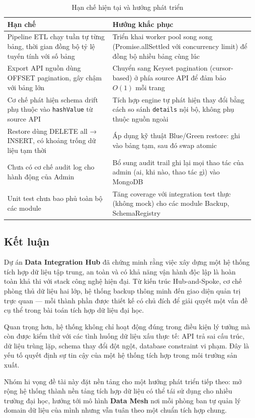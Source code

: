 \begin{table}[H]
\centering
\caption{Hạn chế hiện tại và hướng phát triển}
\label{tab:limitations}
\begin{tabular}{p{5.5cm}p{7.5cm}}
\toprule
\textbf{Hạn chế} & \textbf{Hướng khắc phục} \\
\midrule
Pipeline ETL chạy tuần tự từng bảng, thời gian đồng bộ tỷ lệ tuyến tính với số bảng &
Triển khai worker pool song song (Promise.allSettled với concurrency limit) để đồng bộ nhiều bảng cùng lúc \\[6pt]

Export API nguồn dùng OFFSET pagination, gây chậm với bảng lớn &
Chuyển sang Keyset pagination (cursor-based) ở phía source API để đảm bảo \(O(1)\) mỗi trang \\[6pt]

Cơ chế phát hiện schema drift phụ thuộc vào \texttt{hashValue} từ source API &
Tích hợp engine tự phát hiện thay đổi bằng cách so sánh \texttt{details} nội bộ, không phụ thuộc nguồn ngoài \\[6pt]

Restore dùng DELETE all → INSERT, có khoảng trống dữ liệu tạm thời &
Áp dụng kỹ thuật Blue/Green restore: ghi vào bảng tạm, sau đó swap atomic \\[6pt]

Chưa có cơ chế audit log cho hành động của Admin &
Bổ sung audit trail ghi lại mọi thao tác của admin (ai, khi nào, thao tác gì) vào MongoDB \\[6pt]

Unit test chưa bao phủ toàn bộ các module &
Tăng coverage với integration test thực (không mock) cho các module Backup, SchemaRegistry \\
\bottomrule
\end{tabular}
\end{table}

\subsection{Kết luận}

Dự án \textbf{Data Integration Hub} đã chứng minh rằng việc xây dựng một hệ thống tích hợp dữ liệu tập trung, an toàn và có khả năng vận hành độc lập là hoàn toàn khả thi với stack công nghệ hiện đại. Từ kiến trúc Hub-and-Spoke, cơ chế phòng thủ dữ liệu hai lớp, hệ thống backup thông minh đến giao diện quản trị trực quan — mỗi thành phần được thiết kế có chủ đích để giải quyết một vấn đề cụ thể trong bài toán tích hợp dữ liệu đại học.

Quan trọng hơn, hệ thống không chỉ hoạt động đúng trong điều kiện lý tưởng mà còn được kiểm thử với các tình huống dữ liệu xấu thực tế: API trả sai cấu trúc, dữ liệu trùng lặp, schema thay đổi đột ngột, database constraint vi phạm. Đây là yếu tố quyết định sự tin cậy của một hệ thống tích hợp trong môi trường sản xuất.

Nhóm hi vọng đề tài này đặt nền tảng cho một hướng phát triển tiếp theo: mở rộng hệ thống thành nền tảng tích hợp dữ liệu có thể tái sử dụng cho nhiều trường đại học, hướng tới mô hình \textbf{Data Mesh} nơi mỗi phòng ban tự quản lý domain dữ liệu của mình nhưng vẫn tuân theo một chuẩn tích hợp chung.